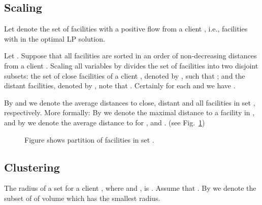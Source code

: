 \documentclass{llncs}
\begin{document}
\subsection{Scaling}

Let  denote the set of facilities with a positive flow from a client , i.e., facilities  with  in the optimal LP solution. 

Let . Suppose that all facilities are sorted in an order of non-decreasing distances from a client . Scaling all  variables by  divides the set of facilities  into two disjoint subsets: the set of close facilities of a client , denoted by , such that ;  and the distant facilities, denoted by , note that . Certainly for each  and  we have .

By  and  we denote the average distances to close, distant and all facilities in set , respectively. More formally:  By  we denote the maximal distance to a facility in , and by  we denote the average distance to  for ,  and . (see Fig.~\ref{partition_of_F_j})

\begin{figure}
  \caption{Figure shows partition of facilities in set .}
  \label{partition_of_F_j}
\end{figure}
 
\subsection{Clustering}

\begin{definition}
 The radius of a set  for a client , where  and , is . Assume that . By  we denote the subset of  of volume  which has the smallest radius.
\end{definition}
\end{document}

